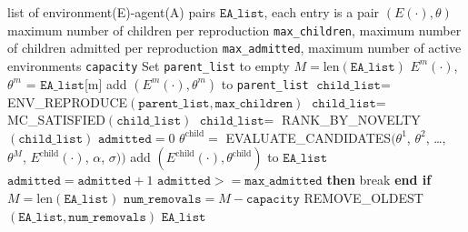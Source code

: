 \documentclass{article}
\newcommand{\jc}[1]{\comments{\textcolor{deepForestGreen}{[JC: #1]}}}
\newcommand{\ks}[1]{\comments{\textcolor{purple}{[Ken: #1]}}}
\newcommand{\rw}[1]{\comments{\textcolor{blue}{[Rui: #1]}}}
\newcommand{\comments}[1]{#1}
\begin{document}
\begin{algorithm}[htp]
\caption{MUTATE\_ENVS}
\label{alg:mutate_niches}
\begin{algorithmic}[1]
    list of environment(E)-agent(A) pairs $\texttt{EA\_list}$,
   each entry is a pair $(E(\cdot), \theta)$
    maximum number of children per reproduction \texttt{max\_children}, maximum number of children admitted per reproduction \texttt{max\_admitted}, maximum number of active environments \texttt{capacity}
    Set \texttt{parent\_list} to empty
   \STATE $M = \textrm{len}(\texttt{EA\_list})$   
   \STATE $E^{m}(\cdot)$, $\theta^{m}$ = $\texttt{EA\_list}$[m]
   \STATE add $(E^{m}(\cdot), \theta^{m})$ to \texttt{parent\_list}
   \ENDIF   
   \ENDFOR 
   \STATE $\texttt{child\_list} = $ ENV\_REPRODUCE$(\texttt{parent\_list}, \texttt{max\_children})$%
   \STATE $\texttt{child\_list} = $ MC\_SATISFIED$(\texttt{child\_list})$%
   \STATE $\texttt{child\_list} = $ RANK\_BY\_NOVELTY$(\texttt{child\_list})$
   \STATE $\texttt{admitted} = 0$
   \STATE $\theta^{\textrm{child}} = $ EVALUATE\_CANDIDATES$(\theta^{1}$, $\theta^{2}$, \ldots, $\theta^{M}$, $E^{\textrm{child}}(\cdot)$, $\alpha$, $\sigma))$
   \STATE add $(E^{\textrm{child}}(\cdot), \theta^{\textrm{child}})$ to $\texttt{EA\_list}$
   \STATE $\texttt{admitted} = \texttt{admitted} + 1$
    $\texttt{admitted} >= \texttt{max\_admitted}$ {\bfseries then} break {\bfseries end if}%
   \ENDIF
   \ENDFOR
   \STATE $M = \textrm{len}(\texttt{EA\_list})$
   \STATE $\texttt{num\_removals} = M - \texttt{capacity}$
   \STATE REMOVE\_OLDEST$(\texttt{EA\_list}, \texttt{num\_removals})$ 
   \ENDIF
    $\texttt{EA\_list}$


   
\end{algorithmic}
\end{algorithm}
\end{document}
